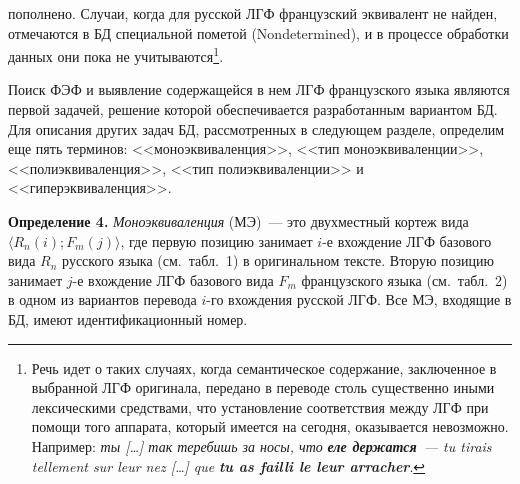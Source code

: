 \begin{multicols}{2}
\addtocounter{table}{1}

\noindent
 пополнено. Случаи, когда для русской ЛГФ французский
эквивалент не найден, отмечаются в БД специальной пометой (Nondetermined),
и в процессе обработки данных они пока не учитываются\footnote{Речь идет о
таких случаях, когда семантическое содержание, заключенное в выбранной ЛГФ
оригинала, передано в переводе столь существенно иными лексическими средствами,
что установление соответствия между ЛГФ при
помощи того аппарата, который имеется на сегодня, оказывается невозможно.
Например: \textit{ты [\ldots] так теребишь за носы, что} {\bfseries\textit{еле
держатся}}~\textit{--- tu tirais tellement sur leur nez [\ldots] que}
{\bfseries\textit{tu as failli le leur arracher}}.}.



  Поиск ФЭФ и выявление содержащейся в нем ЛГФ французского языка
являются первой задачей, решение которой обеспечивается разработанным
вариантом БД. Для описания других задач БД, рассмотренных в следующем
разделе, определим еще пять терминов: <<моноэквиваленция>>, <<тип
моноэквиваленции>>, <<полиэквиваленция>>, <<тип полиэквиваленции>> и
<<гиперэквиваленция>>.

  \smallskip

  \noindent
  \textbf{Определение 4.} \textit{Моноэквиваленция} (МЭ)~--- это двухместный
кортеж вида $\langle R_n(i); F_m(j)\rangle$, где первую позицию занимает $i$-е
вхождение ЛГФ базового вида $R_n$ русского языка (см.\ табл.~1) в
оригинальном тексте. Вторую позицию занимает $j$-е вхождение ЛГФ
базового вида $F_m$ французского языка (см.\ табл.~2) в одном из
вариантов перевода $i$-го вхождения русской ЛГФ. Все МЭ, входящие в БД,
имеют идентификационный номер.

\end{multicols}

